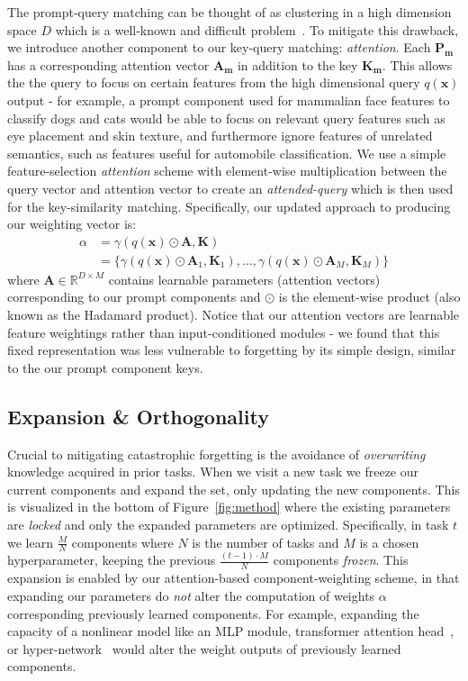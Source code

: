 The prompt-query matching can be thought of as clustering in a high dimension space 
$D$ which is a well-known and difficult problem~\cite{koppen2000curse}. To mitigate this drawback, we introduce another component to our key-query matching: \emph{attention}. Each $\bm{P_m}$ has a corresponding attention vector $\bm{A_m}$ in addition to the key $\bm{K_m}$. This allows the the query to focus on certain features from the high dimensional query $q(\bm{x})$ output - for example, a prompt component used for mammalian face features to classify dogs and cats would be able to focus on relevant query features such as eye placement and skin texture, and furthermore ignore features of unrelated semantics, such as features useful for automobile classification. We use a simple feature-selection \emph{attention} scheme with element-wise multiplication between the query vector and attention vector to create an \emph{attended-query} which is then used for the key-similarity matching. Specifically, our updated approach to producing our weighting vector is:
\begin{equation}
\begin{aligned}
\alpha &= \gamma(q(\bm{x})\odot\bm{A},\bm{K}) \\
&= \{ \gamma(q(\bm{x})\odot\bm{A}_1,\bm{K}_1),\ldots, \gamma(q(\bm{x})\odot\bm{A}_M,\bm{K}_M)\}
\label{eq:prompt_weight_b}
\end{aligned}
\end{equation}
where $\bm{A} \in \mathbb{R}^{D \times M}$ contains learnable parameters (attention vectors) corresponding to our prompt components and $\odot$ is the element-wise product (also known as the Hadamard product). Notice that our attention vectors are learnable feature weightings rather than input-conditioned modules - we found that this fixed representation was less vulnerable to forgetting by its simple design, similar to the our prompt component keys.

\subsection{Expansion \& Orthogonality}
\label{sec:method_expand}

Crucial to mitigating catastrophic forgetting is the avoidance of \emph{overwriting} knowledge acquired in prior tasks. When we visit a new task we freeze our current components and expand the set, only updating the new components. This is visualized in the bottom of Figure~\ref{fig:method} where the existing parameters are \emph{locked} and only the expanded parameters are optimized. Specifically, in task $t$ we learn $\frac{M}{N}$ components where $N$ is the number of tasks and $M$ is a chosen hyperparameter, keeping the previous $\frac{(t-1) \cdot M}{N}$ components \emph{frozen}. This expansion is enabled by our attention-based component-weighting scheme, in that expanding our parameters do \emph{not} alter the computation of weights $\alpha$ corresponding previously learned components. For example, expanding the capacity of a nonlinear model like an MLP module, transformer attention head~\cite{dosovitskiy2020image}, or hyper-network~\cite{von2019continual} would alter the weight outputs of previously learned components. 

